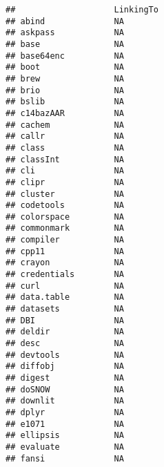 \documentclass[
]{article}
\begin{document}
\begin{verbatim}
##                    LinkingTo                                 
## abind              NA                                        
## askpass            NA                                        
## base               NA                                        
## base64enc          NA                                        
## boot               NA                                        
## brew               NA                                        
## brio               NA                                        
## bslib              NA                                        
## c14bazAAR          NA                                        
## cachem             NA                                        
## callr              NA                                        
## class              NA                                        
## classInt           NA                                        
## cli                NA                                        
## clipr              NA                                        
## cluster            NA                                        
## codetools          NA                                        
## colorspace         NA                                        
## commonmark         NA                                        
## compiler           NA                                        
## cpp11              NA                                        
## crayon             NA                                        
## credentials        NA                                        
## curl               NA                                        
## data.table         NA                                        
## datasets           NA                                        
## DBI                NA                                        
## deldir             NA                                        
## desc               NA                                        
## devtools           NA                                        
## diffobj            NA                                        
## digest             NA                                        
## doSNOW             NA                                        
## downlit            NA                                        
## dplyr              NA                                        
## e1071              NA                                        
## ellipsis           NA                                        
## evaluate           NA                                        
## fansi              NA                                        

\end{verbatim}
\end{document}
